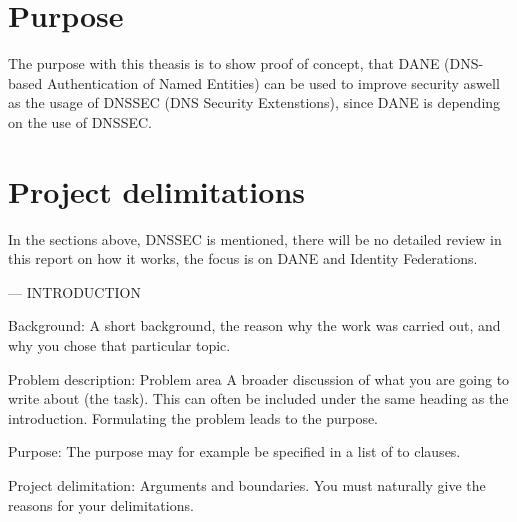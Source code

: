 \section{Purpose}
The purpose with this theasis is to show proof of concept, that DANE (DNS-based Authentication of Named Entities) can be used to improve security aswell as the usage of DNSSEC (DNS Security Extenstions), since DANE is depending on the use of DNSSEC.

\section{Project delimitations}
In the sections above, DNSSEC is mentioned, there will be no detailed review in this report on how it works, the focus is on DANE and Identity Federations. 

---
INTRODUCTION 

Background: A short background, the reason why the work was carried out, and why you chose that particular topic.

Problem description: Problem area A broader discussion of what you are going to write about (the task). This can often be included under the same heading as the introduction. Formulating the problem leads to the purpose.

Purpose: The purpose may for example be specified in a list of to clauses.

Project delimitation: Arguments and boundaries. You must naturally give the reasons for your delimitations.
